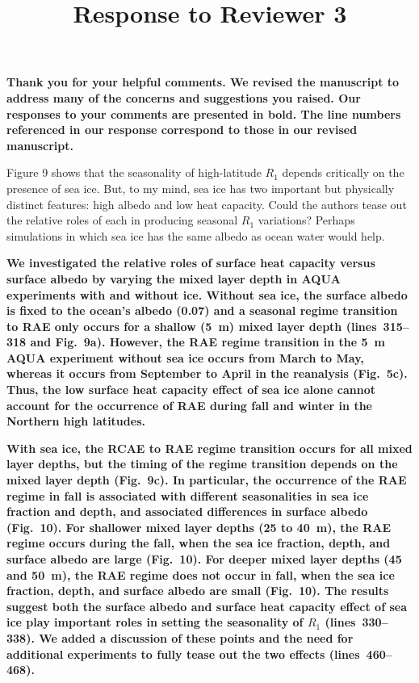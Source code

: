 \documentclass{article}
\title{\vspace{-2.5cm}Response to Reviewer 3\vspace{-2cm}}
\date{}
\author{}
\begin{document}
\maketitle

\textbf{Thank you for your helpful comments. We revised the manuscript to address many of the concerns and suggestions you raised. Our responses to your comments are presented in bold. The line numbers referenced in our response correspond to those in our revised manuscript.}

Figure 9 shows that the seasonality of high-latitude $R_1$ depends critically on the presence of sea ice. But, to my mind, sea ice has two important but physically distinct features: high albedo and low heat capacity. Could the authors tease out the relative roles of each in producing seasonal $R_1$ variations? Perhaps simulations in which sea ice has the same albedo as ocean water would help.

\textbf{We investigated the relative roles of surface heat capacity versus surface albedo by varying the mixed layer depth in AQUA experiments with and without ice. Without sea ice, the surface albedo is fixed to the ocean's albedo (0.07) and a seasonal regime transition to RAE only occurs for a shallow (5~m) mixed layer depth (lines~315--318 and Fig.~9a). However, the RAE regime transition in the 5~m AQUA experiment without sea ice occurs from March to May, whereas it occurs from September to April in the reanalysis (Fig.~5c). Thus, the low surface heat capacity effect of sea ice alone cannot account for the occurrence of RAE during fall and winter in the Northern high latitudes.}

\textbf{With sea ice, the RCAE to RAE regime transition occurs for all mixed layer depths, but the timing of the regime transition depends on the mixed layer depth (Fig.~9c). In particular, the occurrence of the RAE regime in fall is associated with different seasonalities in sea ice fraction and depth, and associated differences in surface albedo (Fig.~10). For shallower mixed layer depths (25 to 40~m), the RAE regime occurs during the fall, when the sea ice fraction, depth, and surface albedo are large (Fig.~10). For deeper mixed layer depths (45 and 50~m), the RAE regime does not occur in fall, when the sea ice fraction, depth, and surface albedo are small (Fig.~10). The results suggest both the surface albedo and surface heat capacity effect of sea ice play important roles in setting the seasonality of $R_1$ (lines~330--338). We added a discussion of these points and the need for additional experiments to fully tease out the two effects (lines~460--468).}
\end{document}
